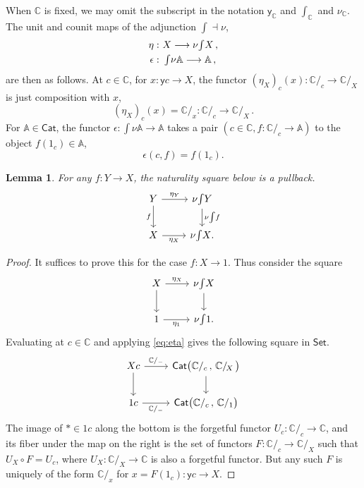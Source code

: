 \documentclass[11pt,reqno]{amsart}
\newcommand{\A}{\ensuremath{\mathbb{A}}}
\newcommand{\bbC}{\ensuremath{\mathbb{C}}}
\newcommand{\Set}{\ensuremath{\mathsf{Set}}}
\newcommand{\Cat}{\ensuremath{\mathsf{Cat}}}
\newcommand{\slice}[1]{\ensuremath{/_{\!{#1}}}}
\newcommand{\y}{\ensuremath{\mathsf{y}}} %
\newcommand{\yon}{\ensuremath{\mathsf{y}}} %
\newcommand{\ra}{\ensuremath{\rightarrow}}
\renewcommand{\to}{\ensuremath{\rightarrow}}
\newcommand{\too}{\ensuremath{\longrightarrow}}
\newcommand{\elem}[1]{\textstyle\int\!{#1}}%
\newtheorem{lemma}[theorem]{Lemma}
\theoremstyle{remark}
\theoremstyle{definition}
\begin{document}
When $\bbC$ is fixed, we may omit the subscript in the notation $\yon_\bbC$ and  $\int_\bbC$ and $\nu_\bbC$.  The unit and counit maps of the adjunction $\int \dashv \nu$, 
\begin{align*}\textstyle
\eta :&\ \textstyle  X \too \nu{\elem{X}}\,, \\
\epsilon :&\ \textstyle  \elem\nu\A \too \A\,,
\end{align*}
 are then as follows.  At $c\in\bbC$, for $x : \y{c}\ra X$, the functor $(\eta_X)_c(x) : \bbC/_c \to \bbC\slice{X}$ is just composition with $x$, 
\begin{equation}\label{eq:eta}
(\eta_X)_c(x) = \bbC\slice{x} : \bbC\slice{c} \too \bbC\slice{X}\,.
\end{equation}
For $\A\in\Cat$, the functor $ \epsilon : \int\nu\A \to \A$ takes a pair $(c\in\bbC, f : \bbC/_c \to \A)$ to the object $f(1_c) \in \A$,
\[
\epsilon(c,f) = f(1_c).
\]
\begin{lemma}\label{lemma:natpb}
For any $f : Y\to X$, the naturality square below is a pullback.
\begin{equation}\label{eq:naturality}\textstyle
\begin{tikzcd}
	 Y \ar[d, swap,"f"] \ar[r, "{\eta_Y}"] & \nu{\int\!{Y}} \ar[d, "{ \nu{\int\!{f}}}"]\\  
	X \ar[r, swap,"{\eta_X}"] &   \nu{\int\!{X}}.
 \end{tikzcd}
 \end{equation}
\end{lemma}

\begin{proof}
It suffices to prove this for the case $f : X\ra 1$.  Thus consider the square 
\begin{equation}\label{eq:naturalityobject}\textstyle
\begin{tikzcd}
	 X \ar[d] \ar[r, "{\eta_X}"] & \nu{\int\!{X}} \ar[d]\\  
	1\ar[r, swap,"{\eta_1}"] &   \nu{\int\! 1}.
 \end{tikzcd}
 \end{equation}
Evaluating at $c\in\bbC$ and applying \eqref{eq:eta} gives the following square in $\Set$.
\begin{equation}\label{eq:naturalityobjecteval}\textstyle
\begin{tikzcd}
	 Xc \ar[d] \ar[r, "{\bbC/_{-}}"] & \Cat\big( {\bbC/_c}\,,\, {\bbC\slice{X}}\, \big) \ar[d]\\  
	1c\ar[r, swap, "{\bbC/_{-}}"] &   \Cat\big( {\bbC/_c}\,,\, \bbC/_1 \big)
 \end{tikzcd}
 \end{equation}
The image of $*\in 1c$ along the bottom is the forgetful functor $U_c : \bbC/_c\to \bbC$, and its fiber under the map on the right is the set of functors $F : {\bbC/_c}\to {\bbC\slice{X}}$ such that $U_X\circ F = U_c$, where $U_X : \bbC\slice{X}\to \bbC$ is also a forgetful functor. But any such $F$ is uniquely of the form $\bbC/_{x}$ for $x = F(1_c) : \y{c} \to X$.
\end{proof}
\end{document}
